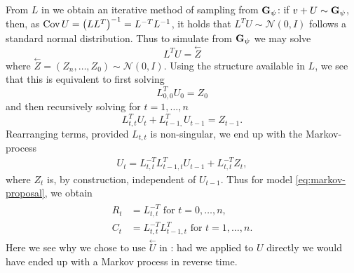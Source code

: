 From $L$ in  we obtain an iterative method of sampling from $\mathbf G_{\psi}$: if $v + U \sim \mathbf G_{\psi}$, then, as $\operatorname{Cov} U = \left( L L^{T} \right)^{-1} = L^{-T}L^{-1}$, it holds that $L^{T}U \sim \mathcal N(0, I)$ follows a standard normal distribution. Thus to simulate from $\mathbf G_{\psi}$ we may solve
$$
L^{T}U = \overset{\leftarrow} Z
$$
where $\overset{\leftarrow}Z = \left( Z_{n}, \dots, Z_{0} \right) \sim \mathcal N(0, I)$. Using the structure available in $L$, we see that this is equivalent to first solving
$$
L_{0,0}^T U_{0} = Z_{0}
$$
and then recursively solving for $t = 1, \dots, n$
$$
L_{t,t}^T U_{t} + L_{t-1, }^{T} U_{t-1} = Z_{t - 1}.
$$
Rearranging terms, provided $L_{t,t}$ is non-singular, we end up with the Markov-process
\begin{align}
\label{eq:rev_time_u}
    U_{t} = L^{-T}_{t,t} L_{t-1, t }^T U_{t - 1} +L^{-T}_{t,t} Z_{t},
\end{align}
where $Z_{t}$ is, by construction, independent of $U_{t - 1}$. Thus for model \eqref{eq:markov-proposal}, we obtain
\begin{align}
    \label{eq:parameters_markov_from_L}
    \begin{split}
    R_{t} &= L^{-T}_{t,t} \text{ for } t = 0, \dots, n,\\
    C_{t} &= L^{-T}_{t,t} L_{t-1, t }^T \text{ for } t =1, \dots, n.
    \end{split}
\end{align}
Here we see why we chose to use $\overset{\leftarrow}U$ in : had we applied  to $U$ directly we would have ended up with a Markov process in reverse time.

